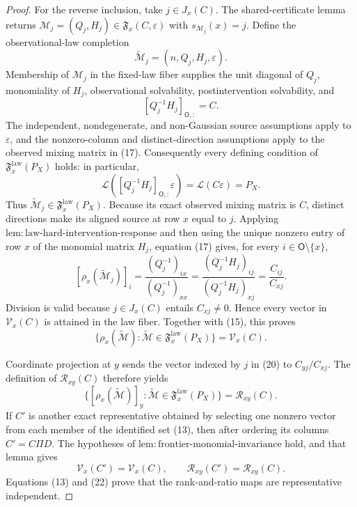 \documentclass{article}
\begin{document}
\begin{proof}
For the reverse inclusion, take \(j\in J_x(C)\). The shared-certificate lemma returns \(\mathcal M_j=(Q_j,H_j)\in\mathfrak F_x(C,\varepsilon)\) with \(s_{\mathcal M_j}(x)=j\). Define the observational-law completion
\[
 \widetilde{\mathcal M}_j=(n,Q_j,H_j,\varepsilon). \tag{16}
\]
Membership of \(\mathcal M_j\) in the fixed-law fiber supplies the unit diagonal of \(Q_j\), monomiality of \(H_j\), observational solvability, postintervention solvability, and
\[
 [Q_j^{-1}H_j]_{\mathsf O,:}=C. \tag{17}
\]
The independent, nondegenerate, and non-Gaussian source assumptions apply to \(\varepsilon\), and the nonzero-column and distinct-direction assumptions apply to the observed mixing matrix in (17). Consequently every defining condition of \(\mathfrak F_x^{\mathrm{law}}(P_X)\) holds: in particular,
\[
 \mathcal L([Q_j^{-1}H_j]_{\mathsf O,:}\varepsilon)
 =\mathcal L(C\varepsilon)=P_X. \tag{18}
\]
Thus \(\widetilde{\mathcal M}_j\in\mathfrak F_x^{\mathrm{law}}(P_X)\). Because its exact observed mixing matrix is \(C\), distinct directions make its aligned source at row \(x\) equal to \(j\). Applying \(\mathrm{lem{:}law\text{-}hard\text{-}intervention\text{-}response}\) and then using the unique nonzero entry of row \(x\) of the monomial matrix \(H_j\), equation (17) gives, for every \(i\in\mathsf O\setminus\{x\}\),
\[
 [\rho_x(\widetilde{\mathcal M}_j)]_i
 =\frac{(Q_j^{-1})_{ix}}{(Q_j^{-1})_{xx}}
 =\frac{(Q_j^{-1}H_j)_{ij}}{(Q_j^{-1}H_j)_{xj}}
 =\frac{C_{ij}}{C_{xj}}. \tag{19}
\]
Division is valid because \(j\in J_x(C)\) entails \(C_{xj}\ne0\). Hence every vector in \(\mathcal V_x(C)\) is attained in the law fiber. Together with (15), this proves
\[
 \{\rho_x(\widetilde{\mathcal M}):\widetilde{\mathcal M}\in\mathfrak F_x^{\mathrm{law}}(P_X)\}
 =\mathcal V_x(C). \tag{20}
\]

Coordinate projection at \(y\) sends the vector indexed by \(j\) in (20) to \(C_{yj}/C_{xj}\). The definition of \(\mathcal R_{xy}(C)\) therefore yields
\[
 \{[\rho_x(\widetilde{\mathcal M})]_y:\widetilde{\mathcal M}\in\mathfrak F_x^{\mathrm{law}}(P_X)\}
 =\mathcal R_{xy}(C). \tag{21}
\]
If \(C'\) is another exact representative obtained by selecting one nonzero vector from each member of the identified set (13), then after ordering its columns \(C'=C\Pi D\). The hypotheses of \(\mathrm{lem{:}frontier\text{-}monomial\text{-}invariance}\) hold, and that lemma gives
\[
 \mathcal V_x(C')=\mathcal V_x(C),
 \qquad
 \mathcal R_{xy}(C')=\mathcal R_{xy}(C). \tag{22}
\]
Equations (13) and (22) prove that the rank-and-ratio maps are representative independent.


\end{proof}
\end{document}

